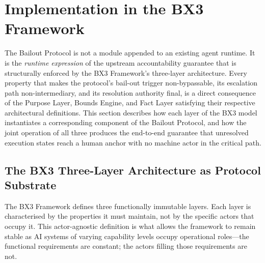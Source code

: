 \section{Implementation in the BX3 Framework}
\label{sec:implementation}

The Bailout Protocol is not a module appended to an existing agent runtime. It is the \textit{runtime expression} of the upstream accountability guarantee that is structurally enforced by the BX3 Framework's three-layer architecture. Every property that makes the protocol's bail-out trigger non-bypassable, its escalation path non-intermediary, and its resolution authority final, is a direct consequence of the Purpose Layer, Bounds Engine, and Fact Layer satisfying their respective architectural definitions. This section describes how each layer of the BX3 model instantiates a corresponding component of the Bailout Protocol, and how the joint operation of all three produces the end-to-end guarantee that unresolved execution states reach a human anchor with no machine actor in the critical path.

\subsection{The BX3 Three-Layer Architecture as Protocol Substrate}
\label{sec:bx3-layers}

The BX3 Framework defines three functionally immutable layers. Each layer is characterised by the properties it must maintain, not by the specific actors that occupy it. This actor-agnostic definition is what allows the framework to remain stable as AI systems of varying capability levels occupy operational roles---the functional requirements are constant; the actors filling those requirements are not.


